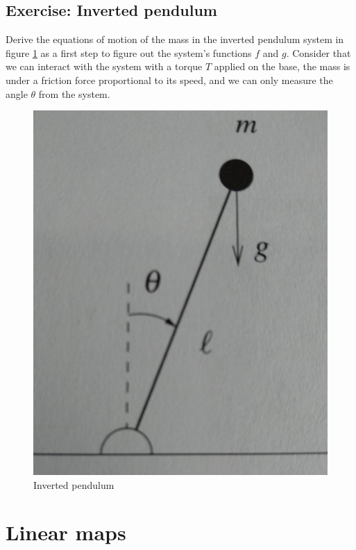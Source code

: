 \subsection{Exercise: Inverted pendulum}

Derive the equations of motion of the mass in the inverted pendulum system in figure \ref{fig: invpen} as a first step to figure out the system's functions $f$ and $g$. Consider that we can interact with the system with a torque $T$ applied on the base, the mass is under a friction force proportional to its speed, and we can only measure the angle $\theta$ from the system.

\begin{figure}[!h]
\centering
	\includegraphics[scale=0.1]{./figuras/invpen.png}
	\caption{Inverted pendulum}
	\label{fig: invpen}
\end{figure}


\section{Linear maps}

